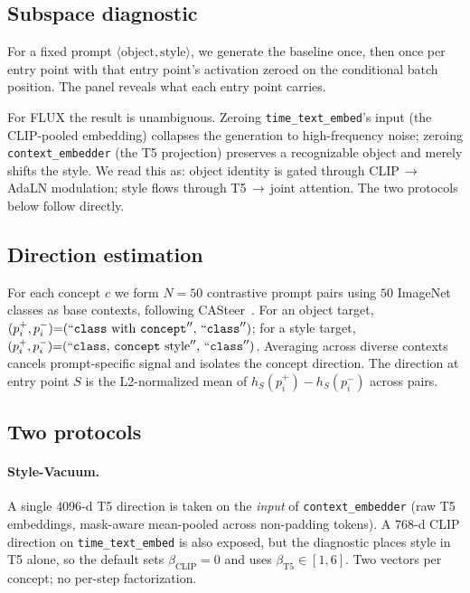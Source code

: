 \documentclass{article}
\begin{document}
\subsection{Subspace diagnostic}
\label{sec:method_diag}

For a fixed prompt $\langle\text{object},\text{style}\rangle$, we
generate the baseline once, then once per entry point with that
entry point's activation zeroed on the conditional batch position.
The panel reveals what each entry point carries.

For FLUX the result is unambiguous. Zeroing
\texttt{time\_text\_embed}'s input (the CLIP-pooled embedding)
collapses the generation to high-frequency noise; zeroing
\texttt{context\_embedder} (the T5 projection) preserves a
recognizable object and merely shifts the style. We read this as:
object identity is gated through CLIP\,$\to$\,AdaLN modulation; style
flows through T5\,$\to$\,joint attention. The two protocols below
follow directly.

\subsection{Direction estimation}
\label{sec:method_dirs}

For each concept $c$ we form $N{=}50$ contrastive prompt pairs using
$50$ ImageNet classes as base contexts, following
CASteer~\cite{khrulkov2024casteer}. For an object target,
$(p^+_i, p^-_i){=}(\text{``\texttt{class} with \texttt{concept}}'',\,
\text{``\texttt{class}}'')$; for a style target,
$(p^+_i, p^-_i){=}(\text{``\texttt{class}, \texttt{concept} style}'',\,
\text{``\texttt{class}}'')$. Averaging across diverse contexts cancels
prompt-specific signal and isolates the concept direction. The
direction at entry point $S$ is the L2-normalized mean of
$h_S(p^+_i)\!-\!h_S(p^-_i)$ across pairs.

\subsection{Two protocols}
\label{sec:method_protocols}

\paragraph{Style-Vacuum.} A single $4096$-d T5 direction is taken on
the \emph{input} of \texttt{context\_embedder} (raw T5 embeddings,
mask-aware mean-pooled across non-padding tokens). A $768$-d CLIP
direction on \texttt{time\_text\_embed} is also exposed, but the
diagnostic places style in T5 alone, so the default sets
$\beta_{\mathrm{CLIP}}{=}0$ and uses
$\beta_{\mathrm{T5}}\!\in\![1,6]$. Two vectors per concept; no
per-step factorization.
\end{document}
